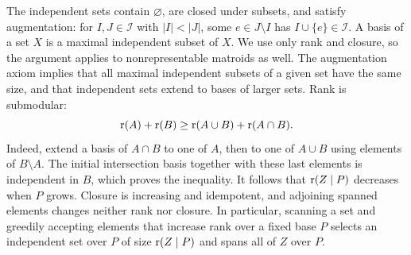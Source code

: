 The independent sets contain $\varnothing$, are closed under subsets, and
satisfy augmentation: for $I,J\in\mathcal I$ with $|I|<|J|$, some
$e\in J\setminus I$ has $I\cup\{e\}\in\mathcal I$.
A basis of a set $X$ is a maximal independent subset of $X$.
We use only rank and closure, so the argument applies to nonrepresentable
matroids as well. The augmentation axiom implies that all maximal
independent subsets of a given set have the same size, and that independent
sets extend to bases of larger sets. Rank is submodular:
\begin{equation}\label{eq:rank-submodular}
 \operatorname{r}(A)+\operatorname{r}(B)\ge\operatorname{r}(A\cup B)+\operatorname{r}(A\cap B).
\end{equation}
Indeed, extend a basis of $A\cap B$ to one of $A$, then to one of $A\cup B$
using elements of $B\setminus A$. The initial intersection basis together
with these last elements is independent in $B$, which proves the inequality.
It follows that $\operatorname{r}(Z\mid P)$ decreases when $P$ grows. Closure is increasing
and idempotent, and adjoining spanned elements changes neither rank nor
closure. In particular, scanning a set and greedily accepting elements that
increase rank over a fixed base $P$ selects an independent set over $P$
of size $\operatorname{r}(Z\mid P)$ and spans all of $Z$ over $P$.
